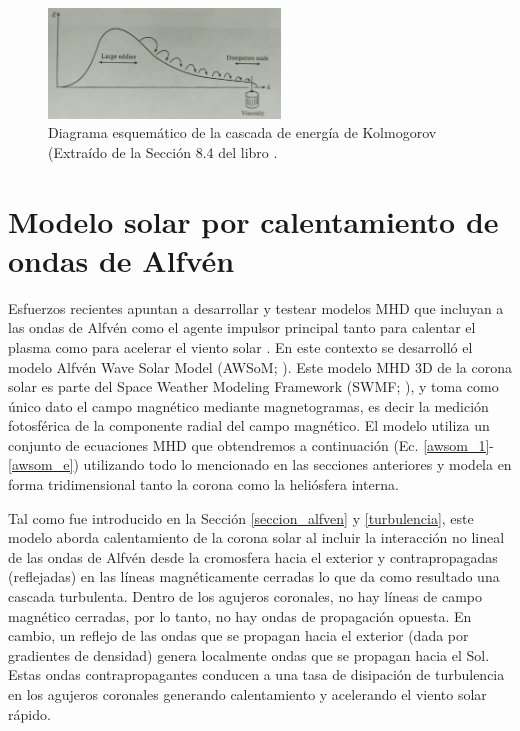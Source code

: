 \documentclass[a4paper,11pt]{report}
\begin{document}
\begin{figure}[ht]
\begin{center}
\includegraphics[width=0.55\textwidth]{figuras/kolmogorov.png}
\end{center}
\caption{Diagrama esquemático de la cascada de energía de Kolmogorov (Extraído de la Sección 8.4 del libro \citet{davidson_2013}.}
\label{kolmogorov}
\end{figure}





\chapter{Modelo solar por calentamiento de ondas de Alfvén} \label{chap_awsom}
Esfuerzos recientes apuntan a desarrollar y testear modelos MHD que incluyan a las ondas de Alfvén como el agente impulsor principal tanto para calentar el plasma como para acelerar el viento solar \citep{gombosi_2018}. En este contexto se desarrolló el modelo Alfvén Wave Solar Model (AWSoM;  \citet{vander_2014}). Este modelo MHD 3D de la corona solar es parte del Space Weather Modeling Framework (SWMF; \citet{swmf_2005}), y toma como único dato el campo magnético mediante magnetogramas, es decir la medición fotosférica de la componente radial del campo magnético. El modelo utiliza un conjunto de ecuaciones MHD que obtendremos a continuación (Ec. \ref{awsom_1}-\ref{awsom_e}) utilizando todo lo mencionado en las secciones anteriores y modela en forma tridimensional tanto la corona como la heliósfera interna.


Tal como fue introducido en la Sección \ref{seccion_alfven} y \ref{turbulencia}, este modelo aborda calentamiento de la corona solar al incluir la interacción no lineal de las ondas de Alfvén desde la cromosfera hacia el exterior y contrapropagadas (reflejadas) en las líneas magnéticamente cerradas lo que da como resultado una cascada turbulenta. Dentro de los agujeros coronales, no hay líneas de campo magnético cerradas, por lo tanto, no hay ondas de propagación opuesta. En cambio, un reflejo de las ondas que se propagan hacia el exterior (dada por gradientes de densidad) genera localmente ondas que se propagan hacia el Sol. Estas ondas contrapropagantes conducen a una tasa de disipación de turbulencia en los agujeros coronales generando calentamiento y acelerando el viento solar rápido.
\end{document}
